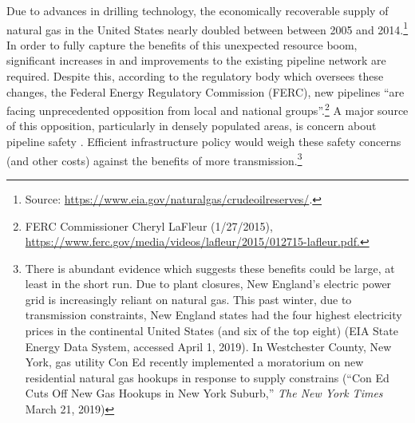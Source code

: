 \documentclass[12pt]{article}
\begin{document}
Due to advances in drilling technology, the economically recoverable supply of natural gas in the United States nearly doubled between between 2005 and 2014.\footnote{Source: \href{https://www.eia.gov/naturalgas/crudeoilreserves/}{https://www.eia.gov/naturalgas/crudeoilreserves/}.} In order to fully capture the benefits of this unexpected resource boom, significant increases in and improvements to the existing pipeline network are required. Despite this, according to the regulatory body which oversees these changes, the Federal Energy Regulatory Commission (FERC), new pipelines ``are facing unprecedented opposition from local and national groups''.\footnote{FERC Commissioner Cheryl LaFleur (1/27/2015), \href{https://www.ferc.gov/media/videos/lafleur/2015/012715-lafleur.pdf.}{https://www.ferc.gov/media/videos/lafleur/2015/012715-lafleur.pdf.} } A major source of this opposition, particularly in densely populated areas, is concern about pipeline safety \citep{parfomak_keeping_2013,parfomak_dots_2016}. Efficient infrastructure policy would weigh these safety concerns (and other costs) against the benefits of more transmission.\footnote{There is abundant evidence which suggests these benefits could be large, at least in the short run. Due to plant closures, New England's electric power grid is increasingly reliant on natural gas. This past winter, due to transmission constraints, New England states had the four highest electricity prices in the continental United States  (and six of the top eight) (EIA State Energy Data System, accessed April 1, 2019). In Westchester County, New York, gas utility Con Ed recently implemented a moratorium on new residential natural gas hookups in response to supply constrains (``Con Ed Cuts Off New Gas Hookups in New York Suburb,'' \textit{The New York Times} March 21, 2019)}
\end{document}

